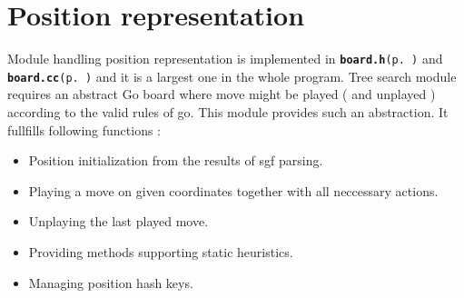 \section{Position representation}\label{page_6}
Module handling position representation is implemented in {\tt {\bf board.h}{\rm (p.\,\pageref{board_8h})}} and {\tt {\bf board.cc}{\rm (p.\,\pageref{board_8cc})}} and it is a largest one in the whole program. Tree search module requires an abstract Go board where move might be played ( and unplayed ) according to the valid rules of go. This module provides such an abstraction. It fullfills following functions :\begin{itemize}
\item Position initialization from the results of sgf parsing.\item Playing a move on given coordinates together with all neccessary actions.\item Unplaying the last played move.\item Providing methods supporting static heuristics.\item Managing position hash keys.\end{itemize}


